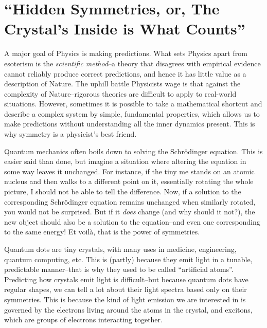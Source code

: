 
\chapter*{``Hidden Symmetries, or, The Crystal's Inside is What Counts''}
\thispagestyle{empty}

A major goal of Physics is making predictions. What sets Physics apart from esoterism is the \textit{scientific method}--a theory that disagrees with empirical evidence cannot reliably produce correct predictions, and hence it has little value as a description of Nature. The uphill battle Physicists wage is that against the complexity of Nature--rigorous theories are difficult to apply to real-world situations. However, sometimes it is possible to take a mathematical shortcut and describe a complex system by simple, fundamental properties, which allows us to make predictions without understanding all the inner dynamics present. This is why symmetry is a physicist's best friend.

Quantum mechanics often boils down to solving the Schrödinger equation. This is easier said than done, but imagine a situation where altering the equation in some way leaves it unchanged. For instance, if the tiny me stands on an atomic nucleus and then walks to a different point on it, essentially rotating the whole picture, I should not be able to tell the difference. Now, if a solution to the corresponding Schrödinger equation remains unchanged when similarly rotated, you would not be surprised. But if it \textit{does} change (and why should it not?), the new object should also be a solution to the equation--and even one corresponding to the same energy! Et voilà, that is the power of symmetries.

Quantum dots are tiny crystals, with many uses in medicine, engineering, quantum computing, etc. This is (partly) because they emit light in a tunable, predictable manner--that is why they used to be called ``artificial atoms''. Predicting how crystals emit light is difficult--but because quantum dots have regular shapes, we can tell a lot about their light spectra based only on their symmetries. This is because the kind of light emission we are interested in is governed by the electrons living around the atoms in the crystal, and excitons, which are groups of electrons interacting together.

